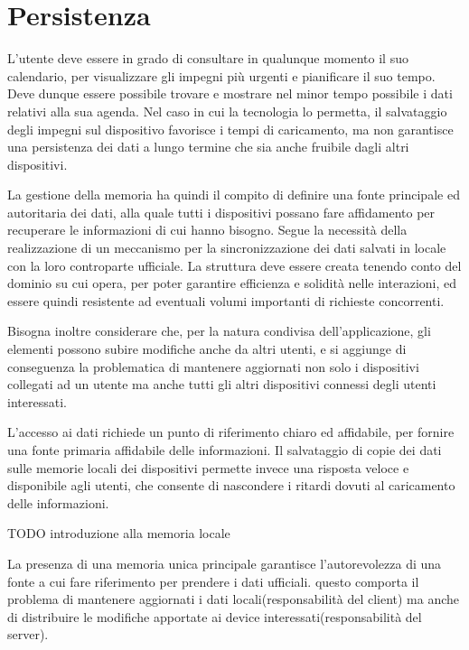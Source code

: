\section{ Persistenza}

L’utente deve essere in grado di consultare in qualunque momento il suo calendario, per visualizzare gli impegni più urgenti e pianificare il suo tempo. Deve dunque essere possibile trovare e mostrare nel minor tempo possibile i dati relativi alla sua agenda. Nel caso in cui la tecnologia lo permetta, il salvataggio degli impegni sul dispositivo favorisce i tempi di caricamento, ma non garantisce una persistenza dei dati a lungo termine che sia anche fruibile dagli altri dispositivi.

La gestione della memoria ha quindi il compito di definire una fonte principale ed autoritaria dei dati, alla quale tutti i dispositivi possano fare affidamento per recuperare le informazioni di cui hanno bisogno. Segue la necessità della realizzazione di un meccanismo per la sincronizzazione dei dati salvati in locale con la loro controparte ufficiale. 
La struttura deve essere creata tenendo conto del dominio su cui opera, per poter garantire efficienza e solidità nelle interazioni, ed essere quindi resistente ad eventuali volumi importanti di richieste concorrenti.

Bisogna inoltre considerare che, per la natura condivisa dell'applicazione, gli elementi possono subire modifiche anche da altri utenti, e si aggiunge di conseguenza la problematica di mantenere aggiornati non solo i dispositivi collegati ad un utente ma anche tutti gli altri dispositivi connessi degli utenti interessati.





L’accesso ai dati richiede un punto di riferimento chiaro ed affidabile, per fornire una fonte primaria affidabile delle informazioni. 
Il salvataggio di copie dei dati sulle memorie locali dei dispositivi permette invece una risposta veloce e disponibile agli utenti, che consente di nascondere i ritardi dovuti al caricamento delle informazioni.

TODO introduzione alla memoria locale

La presenza di una memoria unica principale garantisce l’autorevolezza di una fonte a cui fare riferimento per prendere i dati ufficiali. questo comporta il problema di mantenere aggiornati i dati locali(responsabilità del client) ma anche di distribuire le modifiche apportate ai device interessati(responsabilità del server).

